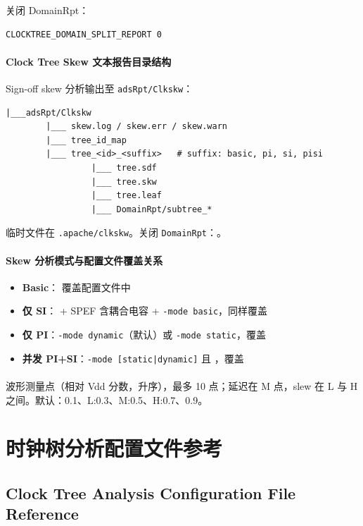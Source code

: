 关闭 DomainRpt：
\begin{lstlisting}
CLOCKTREE_DOMAIN_SPLIT_REPORT 0
\end{lstlisting}

\paragraph{Clock Tree Skew 文本报告目录结构}
Sign-off skew 分析输出至 \texttt{adsRpt/Clkskw}：
\begin{lstlisting}
|___adsRpt/Clkskw
        |___ skew.log / skew.err / skew.warn
        |___ tree_id_map
        |___ tree_<id>_<suffix>   # suffix: basic, pi, si, pisi
                 |___ tree.sdf
                 |___ tree.skw
                 |___ tree.leaf
                 |___ DomainRpt/subtree_*
\end{lstlisting}
临时文件在 \texttt{.apache/clkskw}。关闭 \texttt{DomainRpt}：。

\paragraph{Skew 分析模式与配置文件覆盖关系}
\begin{itemize}
  \item \textbf{Basic}： 覆盖配置文件中 
  \item \textbf{仅 SI}： + SPEF 含耦合电容 + \texttt{-mode basic}，同样覆盖 
  \item \textbf{仅 PI}：\texttt{-mode dynamic}（默认）或 \texttt{-mode static}，覆盖 
  \item \textbf{并发 PI+SI}：\texttt{-mode [static|dynamic]} 且 ，覆盖 
\end{itemize}

\paragraph{}
波形测量点（相对 Vdd 分数，升序），最多 10 点；延迟在 M 点，slew 在 L 与 H 之间。默认：0.1、L:0.3、M:0.5、H:0.7、0.9。


\section{时钟树分析配置文件参考}
\subsection*{Clock Tree Analysis Configuration File Reference}

